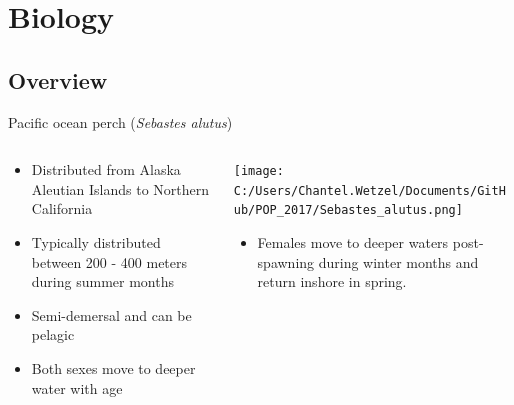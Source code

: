 \documentclass[pdf]{beamer}\usepackage[]{graphicx}\usepackage[]{color}
\begin{document}
\section{Biology}

\subsection{Overview}
\begin{frame}{Pacific ocean perch (\textit{Sebastes alutus})}
\begin{columns}
  \begin{column}{0.5\textwidth}
      \begin{itemize}
        \item Distributed from  Alaska Aleutian Islands to Northern California
        \item Typically distributed between 200 - 400 meters during summer months
        \item Semi-demersal and can be pelagic
        \item Both sexes move to deeper water with age
      \end{itemize}
  \end{column}
  
  \begin{column}{0.5\textwidth}
    \texttt{[image: C:/Users/Chantel.Wetzel/Documents/GitHub/POP\_2017/Sebastes\_alutus.png]}
    \begin{itemize}
        \item Females move to deeper waters post-spawning during winter months and return inshore in spring.
      \end{itemize}
  \end{column}
\end{columns}
\end{frame}
\end{document}
